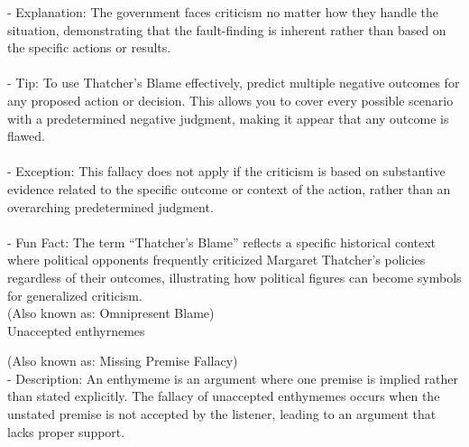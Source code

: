 \documentclass[a4paper,12pt,single,pdftex]{scrartcl}
\begin{document}
    
        - Explanation: The government faces criticism no matter how they handle the situation, demonstrating that the fault-finding is inherent rather than based on the specific actions or results.
    \\

    
      
    \\

    
      - Tip: To use Thatcher’s Blame effectively, predict multiple negative outcomes for any proposed action or decision. This allows you to cover every possible scenario with a predetermined negative judgment, making it appear that any outcome is flawed.
    \\

    
      
    \\

    
      - Exception: This fallacy does not apply if the criticism is based on substantive evidence related to the specific outcome or context of the action, rather than an overarching predetermined judgment.
    \\

    
      
    \\

    
      - Fun Fact: The term “Thatcher’s Blame” reflects a specific historical context where political opponents frequently criticized Margaret Thatcher’s policies regardless of their outcomes, illustrating how political figures can become symbols for generalized criticism.
    \\

  
    
      (Also known as: Omnipresent Blame)
    \\

  

Unaccepted enthyrnemes
    
      (Also known as: Missing Premise Fallacy)
    \\

  
    
      - Description: An enthymeme is an argument where one premise is implied rather than stated explicitly. The fallacy of unaccepted enthymemes occurs when the unstated premise is not accepted by the listener, leading to an argument that lacks proper support. 
    \\

    
      
\end{document}
